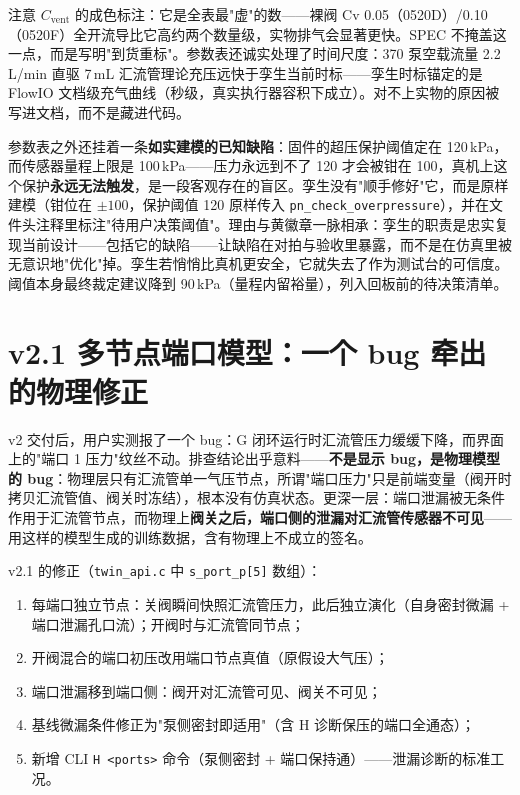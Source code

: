 注意 $C_\text{vent}$ 的成色标注：它是全表最"虚"的数——裸阀 Cv 0.05（0520D）/0.10（0520F）全开流导比它高约两个数量级，实物排气会显著更快。SPEC 不掩盖这一点，而是写明"到货重标"。参数表还诚实处理了时间尺度：370 泵空载流量 2.2\,L/min 直驱 7\,mL 汇流管理论充压远快于孪生当前时标——孪生时标锚定的是 FlowIO 文档级充气曲线（秒级，真实执行器容积下成立）。对不上实物的原因被写进文档，而不是藏进代码。

参数表之外还挂着一条\textbf{如实建模的已知缺陷}：固件的超压保护阈值定在 120\,kPa，而传感器量程上限是 100\,kPa——压力永远到不了 120 才会被钳在 100，真机上这个保护\textbf{永远无法触发}，是一段客观存在的盲区。孪生没有"顺手修好"它，而是原样建模（钳位在 $\pm100$，保护阈值 120 原样传入 \texttt{pn\_check\_overpressure}），并在文件头注释里标注"待用户决策阈值"。理由与黄徽章一脉相承：孪生的职责是忠实复现当前设计——包括它的缺陷——让缺陷在对拍与验收里暴露，而不是在仿真里被无意识地"优化"掉。孪生若悄悄比真机更安全，它就失去了作为测试台的可信度。阈值本身最终裁定建议降到 90\,kPa（量程内留裕量），列入回板前的待决策清单。

\section{v2.1 多节点端口模型：一个 bug 牵出的物理修正}
\label{sec:twin-v21}

v2 交付后，用户实测报了一个 bug：G 闭环运行时汇流管压力缓缓下降，而界面上的"端口 1 压力"纹丝不动。排查结论出乎意料——\textbf{不是显示 bug，是物理模型的 bug}：物理层只有汇流管单一气压节点，所谓"端口压力"只是前端变量（阀开时拷贝汇流管值、阀关时冻结），根本没有仿真状态。更深一层：端口泄漏被无条件作用于汇流管节点，而物理上\textbf{阀关之后，端口侧的泄漏对汇流管传感器不可见}——用这样的模型生成的训练数据，含有物理上不成立的签名。

v2.1 的修正（\texttt{twin\_api.c} 中 \texttt{s\_port\_p[5]} 数组）：

\begin{enumerate}
  \item 每端口独立节点：关阀瞬间快照汇流管压力，此后独立演化（自身密封微漏 + 端口泄漏孔口流）；开阀时与汇流管同节点；
  \item 开阀混合的端口初压改用端口节点真值（原假设大气压）；
  \item 端口泄漏移到端口侧：阀开对汇流管可见、阀关不可见；
  \item 基线微漏条件修正为"泵侧密封即适用"（含 H 诊断保压的端口全通态）；
  \item 新增 CLI \texttt{H <ports>} 命令（泵侧密封 + 端口保持通）——泄漏诊断的标准工况。
\end{enumerate}

